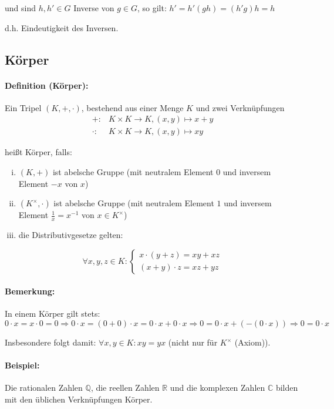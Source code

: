 	und sind $h,h'\in G$ Inverse von $g\in G$, so gilt:\hfill
	$ h' = h'(gh) = (h'g)h = h $

	
	d.h. Eindeutigkeit des Inversen.

\subsection{Körper}
\paragraph{Definition (Körper):}
	Ein Tripel $(K,+,\cdot)$, bestehend aus einer Menge $K$ und zwei Verknüpfungen
	\begin{align*}
		+:&K\times K\to K,(x,y)\mapsto x+y\\
		\cdot : &K\times K\to K, (x,y)\mapsto xy
	\end{align*}
	
	heißt Körper, falls:
	\begin{enumerate}[(i)]
		\item $(K,+)$ ist abelsche Gruppe (mit neutralem Element $0$ und inversem Element $-x$ von $x$)
		\item $(K^\times,\cdot)$ ist abelsche Gruppe (mit neutralem Element $1$ und inversem Element $\frac{1}{x} = x^{-1}$ von $x\in K^\times$)
		\item die Distributivgesetze gelten:
	\end{enumerate}
	
	\begin{equation*}
		\forall x,y,z\in K :\begin{cases}x\cdot (y+z) = xy+xz\\ (x+y)\cdot z = xz+yz \end{cases}
	\end{equation*}

\paragraph{Bemerkung:}
	In einem Körper gilt stets:
	\begin{equation*}
		0\cdot x = x\cdot 0 = 0 \Rightarrow
		0\cdot x = (0+0)\cdot x = 0\cdot x + 0\cdot x \Rightarrow
		0 = 0\cdot x + (-(0\cdot x)) \Rightarrow 0 = 0\cdot x
	\end{equation*}
	
	Insbesondere folgt damit: $\forall x,y\in K: xy = yx$ (nicht nur für $K^\times$ (Axiom)).
\paragraph{Beispiel:}
	Die rationalen Zahlen $\mathbb{Q}$, die reellen Zahlen $\mathbb{R}$ und die komplexen Zahlen $\mathbb{C}$ bilden mit den üblichen Verknüpfungen Körper.

